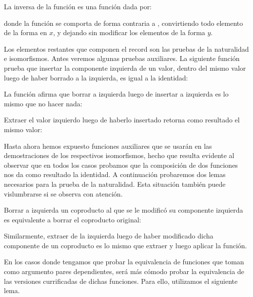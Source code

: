 

La inversa de la función \AgdaFunction{$\curry{\_}$} es una función \AgdaFunction{$\uncurry{\_}$} dada por:


donde la función  se comporta de forma contraria a , convirtiendo todo elemento de la forma  en  $x$, y dejando sin modificar los elementos de la forma  $y$.


Los elementos restantes que componen el record  son las pruebas de la naturalidad e isomorfismos. Antes veremos algunas pruebas auxiliares.
La siguiente función prueba que insertar la componente izquierda de un valor, dentro del mismo valor luego de haber borrado a la izquierda, es igual a la identidad:

La función  afirma que borrar a izquierda luego de insertar a izquierda es lo mismo que no hacer nada:

Extraer el valor izquierdo luego de haberlo insertado retorna como resultado el mismo valor: 


Hasta ahora hemos expuesto funciones auxiliares que se usarán en las demostraciones de los respectivos isomorfismos, hecho que resulta evidente al observar que en todos los casos probamos que la composición de dos funciones nos da como resultado la identidad. A continuación probaremos dos lemas necesarios para la prueba de la naturalidad. Esta situación también puede vislumbrarse si se observa con atención. 

Borrar a izquierda un coproducto al que se le modificó su componente izquierda es equivalente a borrar el coproducto original:

Similarmente, extraer de la izquierda luego de haber modificado dicha componente de un coproducto es lo mismo que extraer y luego aplicar la función.

En los casos donde tengamos que probar la equivalencia de funciones que toman como argumento pares dependientes, será más cómodo probar la equivalencia de las versiones currificadas de dichas funciones. Para ello, utilizamos el siguiente lema.

